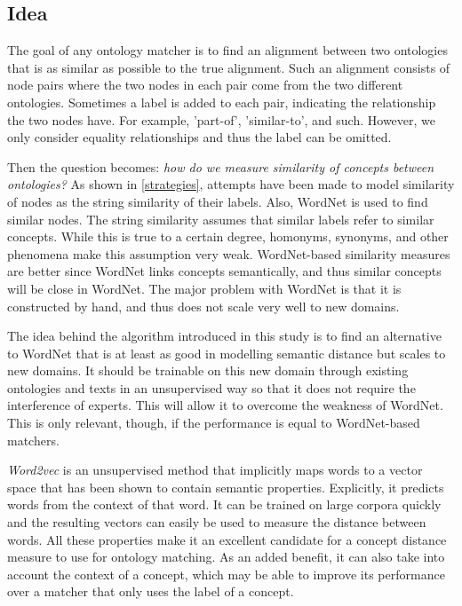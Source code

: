 \documentclass{article}
\begin{document}
 \subsection{Idea}
The goal of any ontology matcher is to find an alignment between two ontologies that is as similar as possible to the true alignment. Such an alignment consists of node pairs where the two nodes in each pair come from the two different ontologies. Sometimes a label is added to each pair, indicating the relationship the two nodes have. For example, 'part-of', 'similar-to', and such. However, we only consider equality relationships and thus the label can be omitted.
 
 Then the question becomes: \textit{how do we measure similarity of concepts between ontologies?} As shown in \ref{strategies}, attempts have been made to model similarity of nodes as the string similarity of their labels. Also, WordNet is used to find similar nodes. The string similarity assumes that similar labels refer to similar concepts. While this is true to a certain degree, homonyms, synonyms, and other phenomena make this assumption very weak. WordNet-based similarity measures are better since WordNet links concepts semantically, and thus similar concepts will be close in WordNet. The major problem with WordNet is that it is constructed by hand, and thus does not scale very well to new domains.
 
 The idea behind the algorithm introduced in this study is to find an alternative to WordNet that is at least as good in modelling semantic distance but scales to new domains. It should be trainable on this new domain through existing ontologies and texts in an unsupervised way so that it does not require the interference of experts. This will allow it to overcome the weakness of WordNet. This is only relevant, though, if the performance is equal to WordNet-based matchers.
 
 \emph{Word2vec} is an unsupervised method that implicitly maps words to a vector space that has been shown to contain semantic properties. Explicitly, it predicts words from the context of that word. %
 It can be trained on large corpora quickly and the resulting vectors can easily be used to measure the distance between words. All these properties make it an excellent candidate for a concept distance measure to use for ontology matching. As an added benefit, it can also take into account the context of a concept, which may be able to improve its performance over a matcher that only uses the label of a concept. 
 
\end{document}
